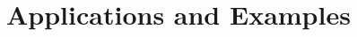 \documentclass[aspectratio=169]{beamer}
\begin{document}
\section{Applications and Examples}





\end{document}
